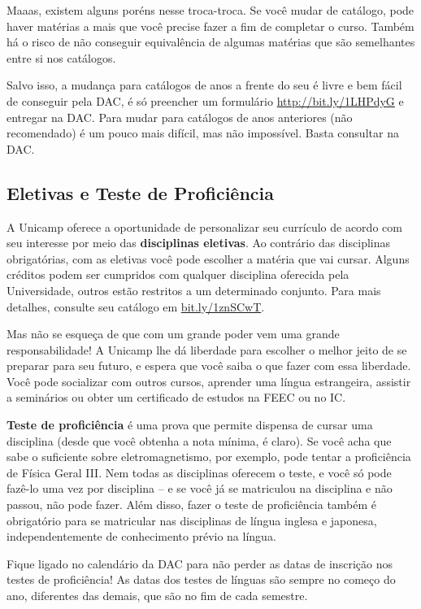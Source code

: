 Maaas, existem alguns poréns nesse troca-troca. Se você mudar de catálogo, pode 
haver matérias a mais que você precise fazer a fim de completar o curso. Também 
há o risco de não conseguir equivalência de algumas matérias que são semelhantes 
entre si nos catálogos. 

Salvo isso, a mudança para catálogos de anos a frente do seu é livre e bem fácil 
de conseguir pela DAC, é só preencher um formulário \url{http://bit.ly/1LHPdyG}
e entregar na DAC. Para mudar para catálogos de anos anteriores (não recomendado)
é um pouco mais difícil, mas não impossível. Basta consultar na DAC.

\subsection{Eletivas e Teste de Proficiência}

A Unicamp oferece a oportunidade de personalizar seu currículo de
acordo com seu interesse por meio das \textbf{disciplinas eletivas}. Ao
contrário das disciplinas obrigatórias, com as eletivas você pode escolher a
matéria que vai cursar. Alguns créditos podem ser cumpridos com qualquer
disciplina oferecida pela Universidade, outros estão restritos a um determinado
conjunto. Para mais detalhes, consulte seu catálogo em
\url{bit.ly/1znSCwT}.

Mas não se esqueça de que com um grande poder vem uma grande responsabilidade!
A Unicamp lhe dá liberdade para escolher o melhor jeito de se preparar para seu
futuro, e espera que você saiba o que fazer com essa liberdade. Você pode
socializar com outros cursos, aprender uma língua estrangeira, assistir a
seminários ou obter um certificado de estudos na FEEC ou no IC.

\textbf{Teste de proficiência} é uma prova que permite dispensa de cursar uma
disciplina (desde que você obtenha a nota mínima, é claro). Se você acha que
sabe o suficiente sobre eletromagnetismo, por exemplo, pode tentar a
proficiência de Física Geral III.  Nem todas as disciplinas oferecem o teste, e
você só pode fazê-lo uma vez por disciplina -- e se você já se matriculou na
disciplina e não passou, não pode fazer.  Além disso, fazer o teste de
proficiência também é obrigatório para se matricular nas disciplinas de língua
inglesa e japonesa, independentemente de conhecimento prévio na língua.

Fique ligado no calendário da DAC para não perder as datas de inscrição nos
testes de proficiência! As datas dos testes de línguas são sempre no começo do
ano, diferentes das demais, que são no fim de cada semestre.

